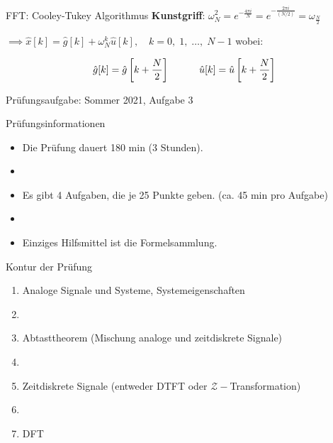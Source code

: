 \documentclass[14pt, aspectratio=169, handout]{beamer}
\begin{document}
\begin{frame}{FFT: Cooley-Tukey Algorithmus}
    \textbf{Kunstgriff}: $\omega_N^2 = e^{-\frac{4 \pi i}{N}} = e^{-\frac{2 \pi i}{(N/2)}} = \omega_{\frac{N}{2}}$

\vspace*{0.5cm}

\vspace*{0.5cm}
$\implies \hat{x}[k] = \hat{g}[k] + \omega_N^k \hat{u}[k], \hspace{12pt} k = 0, \; 1, \; \dots, \; N-1$ wobei:

\vspace*{-0.15cm}
$$\hat{g}[k] = \hat{g}\left[k + \frac{N}{2}\right] \hspace*{30pt} \hat{u}[k] = \hat{u}\left[k + \frac{N}{2}\right]$$
\end{frame}

\begin{frame}{Prüfungsaufgabe: Sommer 2021, Aufgabe 3}
    
\end{frame}

\begin{frame}{Prüfungsinformationen}
    \begin{itemize}
        \item Die Prüfung dauert 180 min (3 Stunden).
        \item[] 
        \item Es gibt 4 Aufgaben, die je 25 Punkte geben. (ca. 45 min pro Aufgabe)
        \item[]
        \item Einziges Hilfsmittel ist die Formelsammlung.
    \end{itemize}
\end{frame}

\begin{frame}{Kontur der Prüfung}
    \begin{enumerate}
        \item Analoge Signale und Systeme, Systemeigenschaften
        \item[] 
        \item Abtasttheorem (Mischung analoge und zeitdiskrete Signale)
        \item[] 
        \item Zeitdiskrete Signale (entweder DTFT oder $\mathcal{Z}-$Transformation)
        \item[] 
        \item DFT
    \end{enumerate}
\end{frame}
\end{document}
